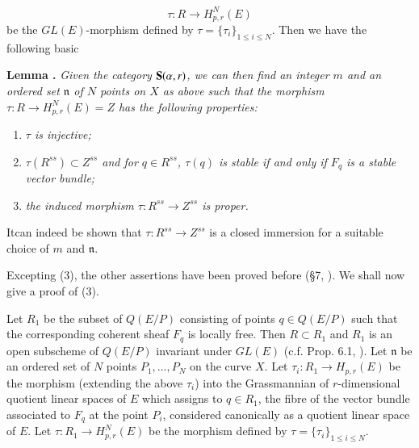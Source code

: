 $$
\tau : R\to H^{N}_{p,r}(E)
$$
be the $GL(E)$-morphism defined by $\tau=\{\tau_{i}\}_{1\leq i\leq N}$. Then we have the following basic

\medskip
\noindent
{\bf Lemma .\label{art18-lem2}}
{\em Given the category $\mathbf{S}(\alpha,r)$, we can then find an integer $m$ and an ordered set $\mathfrak{n}$ of $N$ points on $X$ as above such that the morphism $\tau:R\to H^{N}_{p,r}(E)=Z$ has the following properties:}
\begin{enumerate}
\renewcommand{\labelenumi}{\rm(\theenumi)}
\item {\em $\tau$ is injective;}

\item {\em $\tau(R^{ss})\subset Z^{ss}$ and for $q\in R^{ss}$, $\tau(q)$ is stable if and only if $F_{q}$ is a stable vector bundle;}

\item {\em the induced morphism $\tau :R^{ss}\to Z^{ss}$ is proper.}
\end{enumerate}

\begin{remark*}
It\pageoriginale can indeed be shown that $\tau :R^{ss}\to Z^{ss}$ is a closed immersion for a suitable choice of $m$ and $\mathfrak{n}$.
\end{remark*}

Excepting (3), the other assertions have been proved before (\S7, \cite{art18-key12}). We shall now give a proof of (3).

Let $R_{1}$ be the subset of $Q(E/P)$ consisting of points $q\in Q(E/P)$ such that the corresponding coherent sheaf $F_{q}$ is locally free. Then $R\subset R_{1}$ and $R_{1}$ is an open subscheme of $Q(E/P)$ invariant under $GL(E)$ (c.f. Prop. 6.1, \cite{art18-key12}). Let $\mathfrak{n}$ be an ordered set of $N$ points $P_{1},\ldots,P_{N}$ on the curve $X$. Let $\tau_{i}:R_{1}\to H_{p,r}(E)$ be the morphism (extending the above $\tau_{i}$) into the Grassmannian of $r$-dimensional quotient linear spaces of $E$ which assigns to $q\in R_{1}$, the fibre of the vector bundle associated to $F_{q}$ at the point $P_{i}$, considered canonically as a quotient linear space of $E$. Let $\tau:R_{1}\to H^{N}_{p,r}(E)$ be the morphism defined by $\tau=\{\tau_{i}\}_{1\leq i\leq N}$.

